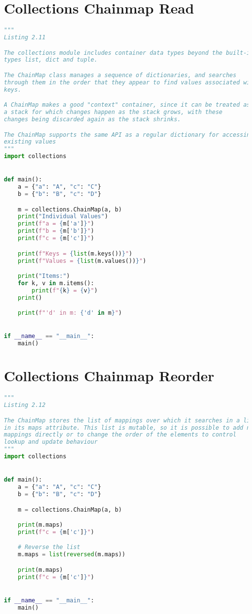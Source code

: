 \documentclass[a4paper,landscape]{report}
\begin{document}
\section{Collections Chainmap Read}
\begin{lstlisting}[language=Python]
"""
Listing 2.11

The collections module includes container data types beyond the built-in
types list, dict and tuple.

The ChainMap class manages a sequence of dictionaries, and searches
through them in the order that they appear to find values associated with
keys.

A ChainMap makes a good "context" container, since it can be treated as
a stack for which changes happen as the stack grows, with these
changes being discarded again as the stack shrinks.

The ChainMap supports the same API as a regular dictionary for accessing
existing values
"""
import collections


def main():
    a = {"a": "A", "c": "C"}
    b = {"b": "B", "c": "D"}

    m = collections.ChainMap(a, b)
    print("Individual Values")
    print(f"a = {m['a']}")
    print(f"b = {m['b']}")
    print(f"c = {m['c']}")

    print(f"Keys = {list(m.keys())}")
    print(f"Values = {list(m.values())}")

    print("Items:")
    for k, v in m.items():
        print(f"{k} = {v}")
    print()

    print(f"'d' in m: {'d' in m}")


if __name__ == "__main__":
    main()

\end{lstlisting}
\section{Collections Chainmap Reorder}
\begin{lstlisting}[language=Python]
"""
Listing 2.12

The ChainMap stores the list of mappings over which it searches in a list
in its maps attribute. This list is mutable, so it is possible to add new
mappings directly or to change the order of the elements to control
lookup and update behaviour
"""
import collections


def main():
    a = {"a": "A", "c": "C"}
    b = {"b": "B", "c": "D"}

    m = collections.ChainMap(a, b)

    print(m.maps)
    print(f"c = {m['c']}")

    # Reverse the list
    m.maps = list(reversed(m.maps))

    print(m.maps)
    print(f"c = {m['c']}")


if __name__ == "__main__":
    main()

\end{lstlisting}
\end{document}
